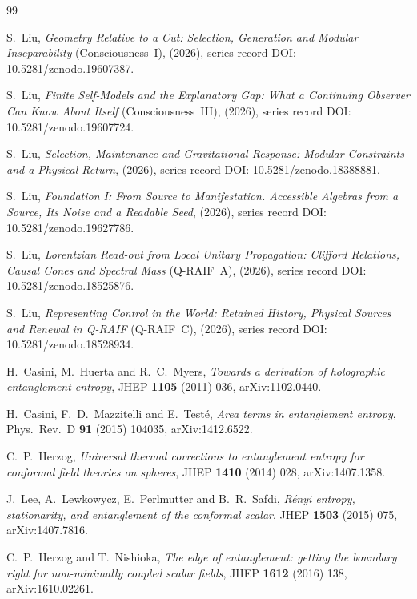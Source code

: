 \documentclass[12pt]{article}
\theoremstyle{definition}
\theoremstyle{remark}
\begin{document}
\newpage
{}
\begin{thebibliography}{99}

S.~Liu, \emph{Geometry Relative to a Cut: Selection, Generation and Modular Inseparability} (Consciousness~I), (2026), series record DOI:
10.5281/zenodo.19607387.

S.~Liu, \emph{Finite Self-Models and the Explanatory Gap: What a Continuing Observer Can
Know About Itself} (Consciousness~III), (2026), series record DOI:
10.5281/zenodo.19607724.

S.~Liu, \emph{Selection, Maintenance and Gravitational Response:
Modular Constraints and a Physical Return}, (2026), series
record DOI: 10.5281/zenodo.18388881.

S.~Liu, \emph{Foundation I: From Source to Manifestation. Accessible Algebras from a
Source, Its Noise and a Readable Seed}, (2026), series record DOI:
10.5281/zenodo.19627786.

S.~Liu, \emph{Lorentzian Read-out from Local Unitary Propagation: Clifford Relations, Causal
Cones and Spectral Mass} (Q-RAIF~A), (2026), series record DOI:
10.5281/zenodo.18525876.

S.~Liu, \emph{Representing Control in the World: Retained History, Physical Sources and Renewal in Q-RAIF} (Q-RAIF~C), (2026), series record DOI:
10.5281/zenodo.18528934.

H.~Casini, M.~Huerta and R.~C.~Myers, \emph{Towards a derivation of holographic
entanglement entropy}, JHEP \textbf{1105} (2011) 036, arXiv:1102.0440.

H.~Casini, F.~D.~Mazzitelli and E.~Test\'e, \emph{Area terms in entanglement entropy},
Phys.\ Rev.\ D \textbf{91} (2015) 104035, arXiv:1412.6522.

C.~P.~Herzog, \emph{Universal thermal corrections to entanglement entropy for
conformal field theories on spheres}, JHEP \textbf{1410} (2014) 028,
arXiv:1407.1358.

J.~Lee, A.~Lewkowycz, E.~Perlmutter and B.~R.~Safdi,
\emph{R\'enyi entropy, stationarity, and entanglement of the conformal scalar},
JHEP \textbf{1503} (2015) 075, arXiv:1407.7816.

C.~P.~Herzog and T.~Nishioka, \emph{The edge of entanglement: getting the boundary
right for non-minimally coupled scalar fields}, JHEP \textbf{1612} (2016) 138,
arXiv:1610.02261.


\end{thebibliography}
\end{document}
